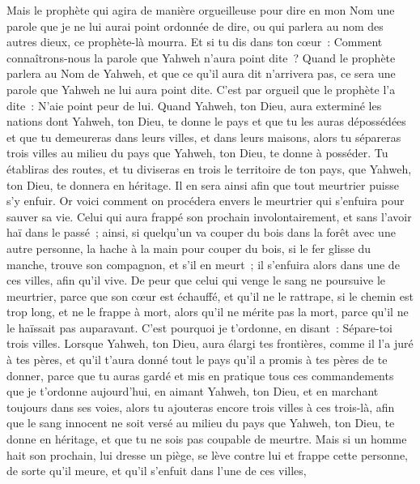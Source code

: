 \begin{multicols}{2}
Mais le prophète qui agira de manière orgueilleuse pour dire en mon Nom une parole que je ne lui aurai point ordonnée de dire, ou qui parlera au nom des autres dieux, ce prophète-là mourra.
Et si tu dis dans ton cœur~: Comment connaîtrons-nous la parole que Yahweh n'aura point dite~?
Quand le prophète parlera au Nom de Yahweh, et que ce qu'il aura dit n'arrivera pas, ce sera une parole que Yahweh ne lui aura point dite. C'est par orgueil que le prophète l'a dite~: N'aie point peur de lui.
\VerseOne{}Quand Yahweh, ton Dieu, aura exterminé les nations dont Yahweh, ton Dieu, te donne le pays et que tu les auras dépossédées et que tu demeureras dans leurs villes, et dans leurs maisons,
alors tu sépareras trois villes au milieu du pays que Yahweh, ton Dieu, te donne à posséder.
Tu établiras des routes, et tu diviseras en trois le territoire de ton pays, que Yahweh, ton Dieu, te donnera en héritage. Il en sera ainsi afin que tout meurtrier puisse s'y enfuir.
Or voici comment on procédera envers le meurtrier qui s'enfuira pour sauver sa vie. Celui qui aura frappé son prochain involontairement, et sans l'avoir haï dans le passé~;
ainsi, si quelqu'un va couper du bois dans la forêt avec une autre personne, la hache à la main pour couper du bois, si le fer glisse du manche, trouve son compagnon, et s'il en meurt~; il s'enfuira alors dans une de ces villes, afin qu'il vive.
De peur que celui qui venge le sang ne poursuive le meurtrier, parce que son cœur est échauffé, et qu'il ne le rattrape, si le chemin est trop long, et ne le frappe à mort, alors qu'il ne mérite pas la mort, parce qu'il ne le haïssait pas auparavant.
C'est pourquoi je t'ordonne, en disant~: Sépare-toi trois villes.
Lorsque Yahweh, ton Dieu, aura élargi tes frontières, comme il l'a juré à tes pères, et qu'il t'aura donné tout le pays qu'il a promis à tes pères de te donner,
parce que tu auras gardé et mis en pratique tous ces commandements que je t'ordonne aujourd'hui, en aimant Yahweh, ton Dieu, et en marchant toujours dans ses voies, alors tu ajouteras encore trois villes à ces trois-là,
afin que le sang innocent ne soit versé au milieu du pays que Yahweh, ton Dieu, te donne en héritage, et que tu ne sois pas coupable de meurtre.
Mais si un homme hait son prochain, lui dresse un piège, se lève contre lui et frappe cette personne, de sorte qu'il meure, et qu'il s'enfuit dans l'une de ces villes,

\end{multicols}

